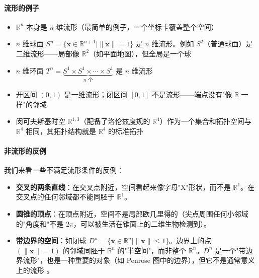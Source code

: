 \paragraph{流形的例子}

\begin{itemize}
    \item $\mathbb{R}^n$ 本身是 $n$ 维流形（最简单的例子，一个坐标卡覆盖整个空间）
    \item $n$ 维球面 $S^n = \{\mathbf{x} \in \mathbb{R}^{n+1} \mid \|\mathbf{x}\| = 1\}$ 是 $n$ 维流形。例如 $S^2$（普通球面）是二维流形——局部像 $\mathbb{R}^2$（如平面地图），但全局是一个球
    \item $n$ 维环面 $T^n = \underbrace{S^1 \times S^1 \times \cdots \times S^1}_{n \text{ 个}}$ 是 $n$ 维流形
    \item 开区间 $(0, 1)$ 是一维流形；闭区间 $[0, 1]$ 不是流形——端点没有"像 $\mathbb{R}$ 一样"的邻域
    \item 闵可夫斯基时空 $\mathbb{R}^{1,3}$（配备了洛伦兹度规的 $\mathbb{R}^4$）作为一个集合和拓扑空间与 $\mathbb{R}^4$ 相同，其拓扑结构就是 $\mathbb{R}^4$ 的标准拓扑
\end{itemize}


\paragraph{非流形的反例}

我们来看一些不满足流形条件的反例：
\begin{itemize}
    \item \textbf{交叉的两条直线}：在交叉点附近，空间看起来像字母"X"形状，而不是 $\mathbb{R}^1$。在交叉点的任何邻域都不能同胚于 $\mathbb{R}^1$。
    \item \textbf{圆锥的顶点}：在顶点附近，空间不是局部欧几里得的（尖点周围任何小邻域的"角度和"不是 $2\pi$，可以被生活在锥面上的二维生物检测到）。
    \item \textbf{带边界的空间}：如闭球 $D^n = \{\mathbf{x} \in \mathbb{R}^n \mid \|\mathbf{x}\| \leq 1\}$。边界上的点 $(\|\mathbf{x}\| = 1)$ 的邻域同胚于 $\mathbb{R}^n$ 的"半空间"，而非整个 $\mathbb{R}^n$。$D^n$ 是一个"带边界流形"，也是一种重要的对象（如 Penrose 图中的边界），但它不是通常意义上的流形 \cite{Tong_GR_LectureNotes}。
\end{itemize}

